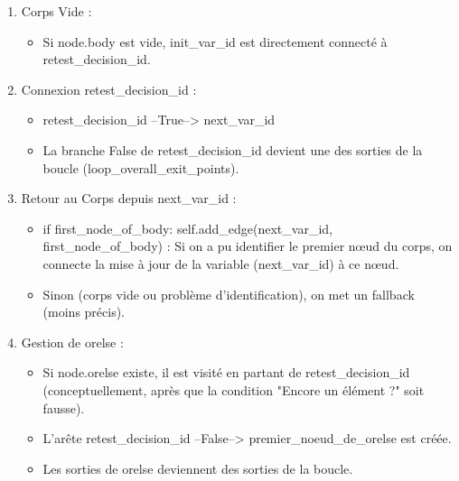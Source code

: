 \documentclass[11pt,a4paper]{article}
\begin{document}
\begin{enumerate}
    \item Corps Vide :
    \begin{itemize}
        \item Si node.body est vide, init\_var\_id est directement connecté à retest\_decision\_id.
    \end{itemize}

    \item Connexion retest\_decision\_id :
    \begin{itemize}
        \item retest\_decision\_id --True--> next\_var\_id
        \item La branche False de retest\_decision\_id devient une des sorties de la boucle (loop\_overall\_exit\_points).
    \end{itemize}

    \item Retour au Corps depuis next\_var\_id :
    \begin{itemize}
        \item if first\_node\_of\_body: self.add\_edge(next\_var\_id, first\_node\_of\_body) : Si on a pu identifier le premier nœud du corps, on connecte la mise à jour de la variable (next\_var\_id) à ce nœud.
        \item Sinon (corps vide ou problème d'identification), on met un fallback (moins précis).
    \end{itemize}

    \item Gestion de orelse :
    \begin{itemize}
        \item Si node.orelse existe, il est visité en partant de retest\_decision\_id (conceptuellement, après que la condition "Encore un élément ?" soit fausse).
        \item L'arête retest\_decision\_id --False--> premier\_noeud\_de\_orelse est créée.
        \item Les sorties de orelse deviennent des sorties de la boucle.
    \end{itemize}
    
\end{enumerate}
\end{document}
